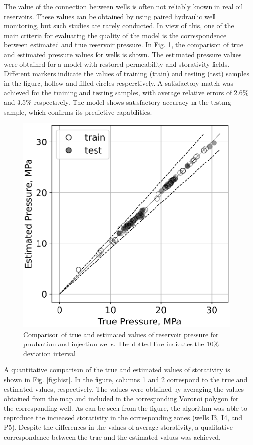 \documentclass[
11pt,%
tightenlines,%
twoside,%
onecolumn,%
nofloats,%
nobibnotes,%
nofootinbib,%
superscriptaddress,%
noshowpacs,%
centertags]%
{revtex4}
\begin{document}
The value of the connection between wells is often not reliably known in real oil reservoirs. These values can be obtained by using paired hydraulic well monitoring, but such studies are rarely conducted. In view of this, one of the main criteria for evaluating the quality of the model is the correspondence between estimated and true reservoir pressure. In Fig. \ref{fig:cp}, the comparison of true and estimated pressure values for wells is shown. The estimated pressure values were obtained for a model with restored permeability and storativity fields. Different markers indicate the values of training (train) and testing (test) samples in the figure, hollow and filled circles resperctively. A satisfactory match was achieved for the training and testing samples, with average relative errors of 2.6\% and 3.5\% respectively. The model shows satisfactory accuracy in the testing sample, which confirms its predictive capabilities.

\begin{figure}
	\centering
	\includegraphics[width=0.5\linewidth]{images/fig6.eps}
	\caption{Comparison of true and estimated values of reservoir pressure for production and injection wells. The dotted line indicates the 10\% deviation interval}
	\label{fig:cp}
\end{figure}

A quantitative comparison of the true and estimated values of storativity is shown in Fig. \ref{fig:hist}. In the figure, columns 1 and 2 correspond to the true and estimated values, respectively. The values were obtained by averaging the values obtained from the map and included in the corresponding Voronoi polygon for the corresponding well. As can be seen from the figure, the algorithm was able to reproduce the increased storativity in the corresponding zones (wells I3, I4, and P5). Despite the differences in the values of average storativity, a qualitative correspondence between the true and the estimated values was achieved.
\end{document}
